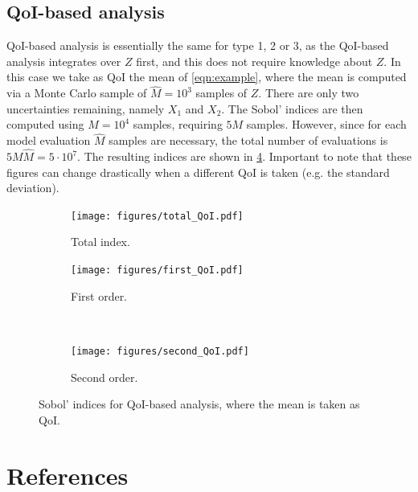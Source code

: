 \documentclass{elsarticle}
\begin{document}
\subsection{QoI-based analysis}
QoI-based analysis is essentially the same for type 1, 2 or 3, as the QoI-based analysis integrates over $Z$ first, and this does not require knowledge about $Z$. In this case we take as QoI the mean of \eqref{eqn:example}, where the mean is computed via a Monte Carlo sample of $\hat{M}=10^{3}$ samples of $Z$. There are only two uncertainties remaining, namely $X_{1}$ and $X_{2}$. The Sobol' indices are then computed using $M=10^{4}$ samples, requiring $5 M$ samples. However, since for each model evaluation $\hat{M}$ samples are necessary, the total number of evaluations is $5 M \hat{M} = 5 \cdot 10^{7}$. The resulting indices are shown in \ref{fig:QoI}. Important to note that these figures can change drastically when a different QoI is taken (e.g. the standard deviation).

\begin{figure}[hbtp]
\centering
	\begin{subfigure}[b]{.49\textwidth}
	\centering
	\texttt{[image: figures/total\_QoI.pdf]}
	\caption{Total index.\label{fig:total_QoI}}
	\end{subfigure}
	\hfill
	\begin{subfigure}[b]{.49\textwidth}
	\centering
	\texttt{[image: figures/first\_QoI.pdf]}
	\caption{First order.\label{fig:first_QoI}}
	\end{subfigure}\\
	\begin{subfigure}[b]{.49\textwidth}
	\centering
	\texttt{[image: figures/second\_QoI.pdf]}
	\caption{Second order.\label{fig:second_QoI}}
	\end{subfigure}
	\caption{Sobol' indices for QoI-based analysis, where the mean is taken as QoI.\label{fig:QoI}}
\end{figure}

%

%
%
%
%
%
%
%


\FloatBarrier
%
%
%


\section{References}

\end{document}
